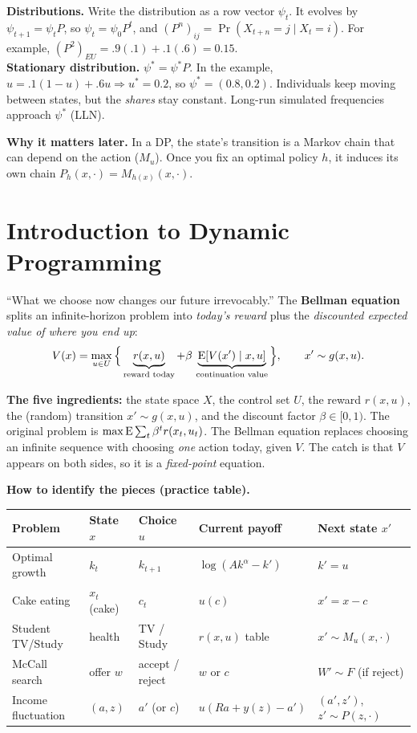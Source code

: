 \documentclass[10pt]{article}
\begin{document}
\textbf{Distributions.} Write the distribution as a row vector $\psi_t$. It evolves by $\psi_{t+1}=\psi_tP$, so $\psi_t=\psi_0P^t$, and $(P^n)_{ij}=\Pr(X_{t+n}=j\mid X_t=i)$. For example, $(P^2)_{EU}=.9(.1)+.1(.6)=0.15$.\\
\textbf{Stationary distribution.} $\psi^*=\psi^*P$. In the example, $u=.1(1-u)+.6u\Rightarrow u^*=0.2$, so $\psi^*=(0.8,0.2)$. Individuals keep moving between states, but the \emph{shares} stay constant. Long-run simulated frequencies approach $\psi^*$ (LLN).

\textbf{Why it matters later.} In a DP, the state's transition is a Markov chain that can depend on the action ($M_u$). Once you fix an optimal policy $h$, it induces its own chain $P_h(x,\cdot)=M_{h(x)}(x,\cdot)$.

\section{Introduction to Dynamic Programming}

\begin{bigidea}
``What we choose now changes our future irrevocably.'' The \textbf{Bellman equation} splits an infinite-horizon problem into \emph{today's reward} plus the \emph{discounted expected value of where you end up}:
\[V(x)=\max_{u\in U}\Big\{\underbrace{r(x,u)}_{\text{reward today}}+\beta\,\underbrace{\mathrm{E}[V(x')\mid x,u]}_{\text{continuation value}}\Big\},\qquad x'\sim g(x,u).\]
\end{bigidea}

\textbf{The five ingredients:} the state space $X$, the control set $U$, the reward $r(x,u)$, the (random) transition $x'\sim g(x,u)$, and the discount factor $\beta\in[0,1)$. The original problem is $\max\mathrm{E}\sum_t\beta^tr(x_t,u_t)$. The Bellman equation replaces choosing an infinite sequence with choosing \emph{one} action today, given $V$. The catch is that $V$ appears on both sides, so it is a \emph{fixed-point} equation.

\begin{center}\figBellman\end{center}

\textbf{How to identify the pieces (practice table).}

{\small
\begin{tabular}{@{}lllll@{}}
\hline
Problem & State $x$ & Choice $u$ & Current payoff & Next state $x'$\\ \hline
Optimal growth & $k_t$ & $k_{t+1}$ & $\log(Ak^\alpha-k')$ & $k'=u$\\
Cake eating & $x_t$ (cake) & $c_t$ & $u(c)$ & $x'=x-c$\\
Student TV/Study & health & TV / Study & $r(x,u)$ table & $x'\sim M_u(x,\cdot)$\\
McCall search & offer $w$ & accept / reject & $w$ or $c$ & $W'\sim F$ (if reject)\\
Income fluctuation & $(a,z)$ & $a'$ (or $c$) & $u(Ra+y(z)-a')$ & $(a',z')$, $z'\sim P(z,\cdot)$\\ \hline
\end{tabular}}
\end{document}
